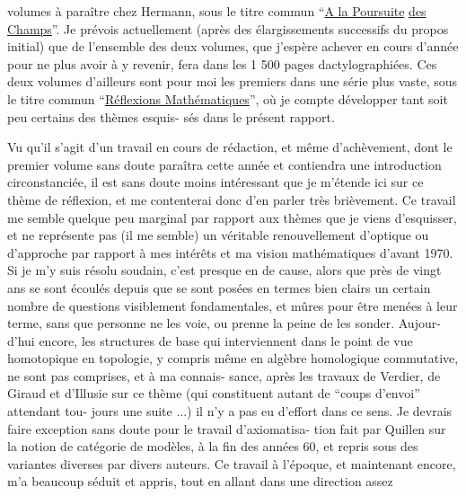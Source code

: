 
volumes à paraître chez Hermann, sous le titre commun ``\uline{A la Poursuite}
\uline{des Champs}''. Je prévois actuellement (après des élargissements
successifs du propos initial) que  de l'ensemble des
deux volumes, que j'espère achever en cours d'année pour ne plus
avoir à y revenir, fera dans les 1 500 pages dactylographiées.
Ces deux volumes d'ailleurs sont pour moi les premiers dans une
série plus vaste, sous le titre commun ``\uline{Réflexions Mathématiques}'',
où je compte développer tant soit peu certains des thèmes esquis-%
sés dans le présent rapport.

Vu qu'il s'agit d'un travail en cours de rédaction,
et même d'achèvement, dont le premier volume sans doute paraîtra
cette année et contiendra une introduction circonstanciée, il
est sans doute moins intéressant que je m'étende ici sur ce thème
de réflexion, et me contenterai donc d'en parler très brièvement.
Ce travail me semble quelque peu marginal par rapport aux thèmes
que je viens d'esquisser, et ne représente pas (il me semble) un
véritable renouvellement d'optique ou d'approche par rapport à
mes intérêts et ma vision mathématiques d'avant 1970. Si je m'y
suis résolu soudain, c'est presque en  de cause, alors
que près de vingt ans se sont écoulés depuis que se sont posées
en termes bien clairs un certain nombre de questions visiblement
fondamentales, et mûres pour être menées à leur terme, sans que
personne ne les voie, ou prenne la peine de les sonder. Aujour-%
d'hui encore, les structures de base qui interviennent dans le
point de vue homotopique en topologie, y compris même en algèbre
homologique commutative, ne sont pas comprises, et à ma connais-%
sance, après les travaux de Verdier, de Giraud et d'Illusie sur
ce thème (qui constituent autant de ``coups d'envoi'' attendant tou-%
jours une suite ...) il n'y a pas eu d'effort dans ce sens. Je
devrais faire exception sans doute pour le travail d'axiomatisa-%
tion fait par Quillen sur la notion de catégorie de modèles, à
la fin des années 60, et repris sous des variantes diverses par
divers auteurs. Ce travail à l'époque, et maintenant encore, m'a
beaucoup séduit et appris, tout en allant dans une direction assez

